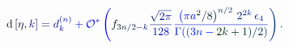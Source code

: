 \documentclass[12pt]{article}
\begin{document}
\makeatletter
\renewcommand*{\@textcolor}[3]{%
  \protect\leavevmode
  \begingroup
    \color#1{#2}#3%
  \endgroup
}
\makeatother
\begin{displaymath}
\mathrm { \mathcolor[RGB]{0,0,15}{d} } \mathcolor[RGB]{0,0,30}{\left[} \mathcolor[RGB]{0,0,45}{\eta} \mathcolor[RGB]{0,0,60}{,} \mathcolor[RGB]{0,0,75}{\mathsf} { \mathcolor[RGB]{0,0,90}{k} } \mathcolor[RGB]{0,0,105}{\right]} \mathcolor[RGB]{0,0,120}{=} \mathcolor[RGB]{0,0,135}{d} _ { \mathcolor[RGB]{0,0,150}{k} } ^ { \mathcolor[RGB]{0,0,165}{(} \mathcolor[RGB]{0,0,180}{n} \mathcolor[RGB]{0,0,195}{)} } \mathcolor[RGB]{0,0,210}{+} \mathcal { \mathcolor[RGB]{0,0,225}{O} } ^ { \mathcolor[RGB]{0,0,240}{\ast} } \mathcolor[RGB]{0,0,255}{\left(} \mathcolor[RGB]{0,15,0}{f} _ { \mathcolor[RGB]{0,15,15}{3} \mathcolor[RGB]{0,15,30}{n} \mathcolor[RGB]{0,15,45}{/} \mathcolor[RGB]{0,15,60}{2} \mathcolor[RGB]{0,15,75}{-} \mathcolor[RGB]{0,15,90}{k} } \mathcolor[RGB]{0,15,105}{\frac { \mathcolor[RGB]{0,15,120}{\sqrt { \mathcolor[RGB]{0,15,135}{2} \mathcolor[RGB]{0,15,150}{\pi} } } } { \mathcolor[RGB]{0,15,165}{1} \mathcolor[RGB]{0,15,180}{2} \mathcolor[RGB]{0,15,195}{8} } } \mathcolor[RGB]{0,15,210}{\frac { \mathcolor[RGB]{0,15,225}{\left(} \mathcolor[RGB]{0,15,240}{\pi} \mathcolor[RGB]{0,15,255}{a} ^ { \mathcolor[RGB]{0,30,0}{2} } \mathcolor[RGB]{0,30,15}{/} \mathcolor[RGB]{0,30,30}{8} \mathcolor[RGB]{0,30,45}{\right)} ^ { \mathcolor[RGB]{0,30,60}{n} \mathcolor[RGB]{0,30,75}{/} \mathcolor[RGB]{0,30,90}{2} } \, \mathcolor[RGB]{0,30,105}{2} ^ { \mathcolor[RGB]{0,30,120}{2} \mathcolor[RGB]{0,30,135}{k} } \, \mathcolor[RGB]{0,30,150}{\epsilon} _ { \mathcolor[RGB]{0,30,165}{4} } } { \mathcolor[RGB]{0,30,180}{\Gamma} \mathcolor[RGB]{0,30,195}{(} \mathcolor[RGB]{0,30,210}{(} \mathcolor[RGB]{0,30,225}{3} \mathcolor[RGB]{0,30,240}{n} \mathcolor[RGB]{0,30,255}{-} \mathcolor[RGB]{0,45,0}{2} \mathcolor[RGB]{0,45,15}{k} \mathcolor[RGB]{0,45,30}{+} \mathcolor[RGB]{0,45,45}{1} \mathcolor[RGB]{0,45,60}{)} \mathcolor[RGB]{0,45,75}{/} \mathcolor[RGB]{0,45,90}{2} \mathcolor[RGB]{0,45,105}{)} } } \mathcolor[RGB]{0,45,120}{\right)} \mathcolor[RGB]{0,45,135}{.}
\end{displaymath}
\end{document}
